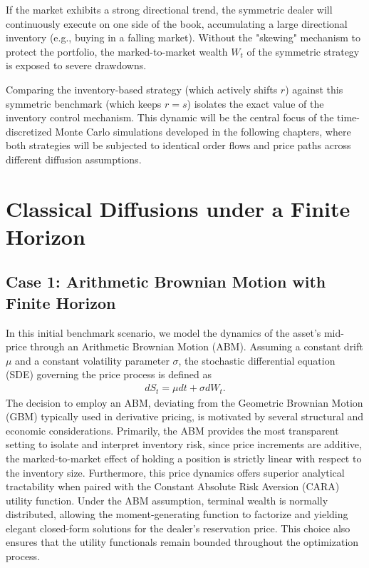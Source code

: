 If the market exhibits a strong directional trend, the symmetric dealer will continuously execute on one side of the book, accumulating a large directional inventory (e.g., buying in a falling market). Without the "skewing" mechanism to protect the portfolio, the marked-to-market wealth $W_t$ of the symmetric strategy is exposed to severe drawdowns. 

Comparing the inventory-based strategy (which actively shifts $r$) against this symmetric benchmark (which keeps $r=s$) isolates the exact value of the inventory control mechanism. This dynamic will be the central focus of the time-discretized Monte Carlo simulations developed in the following chapters, where both strategies will be subjected to identical order flows and price paths across different diffusion assumptions.

\section{Classical Diffusions under a Finite Horizon}


\subsection{Case 1: Arithmetic Brownian Motion with Finite Horizon}\label{sec:abm}

In this initial benchmark scenario, we model the dynamics of the asset's mid-price through an Arithmetic Brownian Motion (ABM). Assuming a constant drift $\mu$ and a constant volatility parameter $\sigma$, the stochastic differential equation (SDE) governing the price process is defined as
\begin{align*}
    dS_t = \mu dt + \sigma dW_t.
\end{align*}
The decision to employ an ABM, deviating from the Geometric Brownian Motion (GBM) typically used in derivative pricing, is motivated by several structural and economic considerations. Primarily, the ABM provides the most transparent setting to isolate and interpret inventory risk, since price increments are additive, the marked-to-market effect of holding a position is strictly linear with respect to the inventory size. Furthermore, this price dynamics offers superior analytical tractability when paired with the Constant Absolute Risk Aversion (CARA) utility function. Under the ABM assumption, terminal wealth is normally distributed, allowing the moment-generating function to factorize and yielding elegant closed-form solutions for the dealer's reservation price. This choice also ensures that the utility functionals remain bounded throughout the optimization process.

